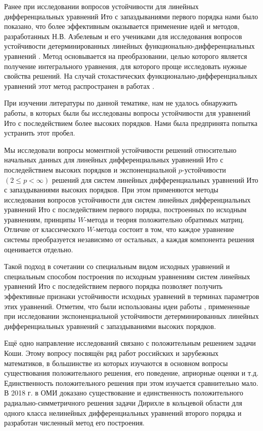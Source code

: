 Ранее при исследовании вопросов устойчивости для линейных дифференциальных уравнений Ито с запаздываниями первого порядка нами было показано, что
более эффективным оказывается применение идей и методов, разработанных Н.В. Азбелевым и его учениками для исследования вопросов устойчивости детерминированных линейных функционально-дифференциальных уравнений \cite{kri-bib-5, kri-bib-6, kri-bib-7, kri-bib-8}.
%
Метод основывается на преобразовании, целью которого является получение интегрального уравнения, для которого проще исследовать нужные свойства решений.
На случай стохастических функционально-дифференциальных уравнений этот метод распространен в работах \cite{kri-bib-9, kri-bib-10, kri-bib-11, kri-bib-12, kri-bib-13, kri-bib-14, kri-bib-15}.

При изучении литературы по данной тематике, нам не удалось обнаружить работы, в которых были бы исследованы вопросы устойчивости для уравнений Ито с последействием более высоких порядков.
Нами была предпринята попытка устранить этот пробел.

Мы исследовали вопросы
моментной устойчивости решений относительно начальных данных для линейных дифференциальных уравнений Ито с последействием высоких порядков
и
экспоненциальной $p$-устойчивости $(2 \le p < \infty)$ решений для систем линейных дифференциальных уравнений Ито с запаздываниями высоких порядков.
При этом применяются методы исследования вопросов устойчивости для систем линейных дифференциальных уравнений Ито с последействием первого порядка, построенных по исходным уравнениям, принципы  $W$-метода и теория положительно обратимых матриц.
Отличие от классического $W$-метода состоит в том, что каждое уравнение системы преобразуется независимо от остальных, а каждая компонента решения оценивается отдельно.

Такой подход в сочетании со специальным видом исходных уравнений и специальным способом построения по исходным уравнениям систем линейных уравнений Ито с последействием первого порядка позволяет получить эффективные признаки устойчивости исходных уравнений в терминах параметров этих уравнений.
Отметим, что были использованы идеи работы \cite{kri-bib-16}, примененные при исследовании экспоненциальной устойчивости детерминированных линейных дифференциальных уравнений с запаздываниями высоких порядков.



Ещё одно направление исследований связано с положительным решением задачи Коши. Этому вопросу посвящён ряд
работ российских и зарубежных математиков, в большинстве из которых изучаются в основном
вопросы существования положительного решения, его поведение,
априорные оценки и т.д.
Единственность положительного решения при этом изучается сравнительно мало.
В 2018 г. в ОМИ доказано существование и единственность положительного радиально-симметричного решения задачи Дирихле в кольцевой
области для одного класса нелинейных дифференциальных уравнений второго порядка и разработан численный метод его построения.

